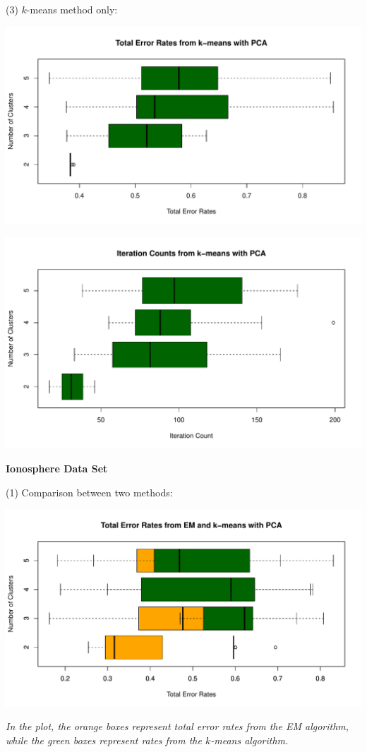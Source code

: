 \documentclass[a4paper,12pt]{article}
\begin{document}
\noindent (3) $k$-means method only:
\begin{center}
  \includegraphics[width=0.8\linewidth]{Image/Prob4-4-TotalErr-Ringnorm-kmeansPCA.pdf}
\end{center}
\begin{center}
  \includegraphics[width=0.8\linewidth]{Image/Prob4-4-ItrCount-Ringnorm-kmeansPCA.pdf}
\end{center}





\bigskip
\begin{center}
    \textcolor{mydarkgreen}{\textbf{Ionosphere Data Set}}
\end{center}

\noindent (1) Comparison between two methods:

\begin{center}
  \includegraphics[width=0.9\linewidth]{Image/Prob4-4-TotalErr-Ionosphere-Both.pdf}
  
   \parbox{0.9\textwidth}{\textit{In the plot, the \textcolor{myorange}{orange boxes} represent total error rates from the EM algorithm, while the \textcolor{mydarkgreen}{green boxes} represent rates from the $k$-means algorithm.
  }}
\end{center}
\bigskip
\end{document}
